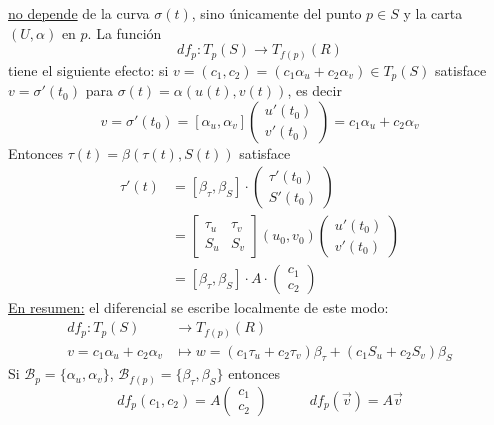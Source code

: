    \underline{no depende} de la curva $\sigma(t)$, sino únicamente del punto $p \in S$ y la carta $(U, \alpha)$ en $p$. La función
   \[
   df_p : T_p(S) \longrightarrow T_{f(p)}(R)
   \]
   tiene el siguiente efecto: si $v = (c_1, c_2) = (c_1 \alpha_u + c_2 \alpha_v) \in T_p(S)$ satisface $v = \sigma'(t_0)$ para $\sigma(t) = \alpha(u(t), v(t))$, es decir
   \[
   v = \sigma'(t_0) = [\alpha_u, \alpha_v] 
   \begin{pmatrix} u'(t_0) \\ v'(t_0) \end{pmatrix} 
   = c_1 \alpha_u + c_2 \alpha_v
   \]
   Entonces $\tau(t) = \beta(\tau(t), S(t))$ satisface
   \begin{align*}
      \tau'(t) &= [\beta_\tau, \beta_S] \cdot \begin{pmatrix} \tau'(t_0) \\ S'(t_0) \end{pmatrix} \\
               &= \begin{bmatrix} \tau_u & \tau_v \\ S_u & S_v \end{bmatrix}{(u_0,v_0)} \begin{pmatrix} u'(t_0) \\ v'(t_0) \end{pmatrix} \\
               &= [\beta_\tau, \beta_S] \cdot A \cdot \begin{pmatrix} c_1 \\ c_2 \end{pmatrix}
   \end{align*}
   \underline{En resumen:} el diferencial se escribe localmente de este modo:
   \begin{equation}
   \begin{aligned}
   df_p : T_p(S) &\longrightarrow T_{f(p)}(R) \\
   v = c_1 \alpha_u + c_2 \alpha_v &\longmapsto w = (c_1 \tau_u + c_2 \tau_v)\beta_\tau + (c_1 S_u + c_2 S_v)\beta_S
   \end{aligned}
   \label{eq:dif1}
   \end{equation}
   Si $\mathcal{B}_p = \{\alpha_u, \alpha_v\}$, $\mathcal{B}_{f(p)} = \{\beta_\tau, \beta_S\}$ entonces
   \begin{equation}
   df_p(c_1, c_2) = A \begin{pmatrix} c_1 \\ c_2 \end{pmatrix} \quad \quad \quad df_p(\vec{v}) = A \vec{v}
   \label{eq:dif2}
   \end{equation}


